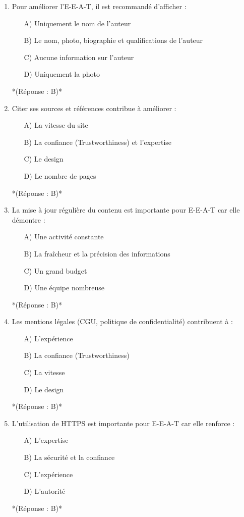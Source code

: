 \documentclass[12pt,a4paper,twoside]{report}
\begin{document}
\begin{enumerate}
\item Pour améliorer l'E-E-A-T, il est recommandé d'afficher :
\begin{itemize}
\item[A)] Uniquement le nom de l'auteur
\item[B)] Le nom, photo, biographie et qualifications de l'auteur
\item[C)] Aucune information sur l'auteur
\item[D)] Uniquement la photo
\end{itemize}
*(Réponse : B)*

\item Citer ses sources et références contribue à améliorer :
\begin{itemize}
\item[A)] La vitesse du site
\item[B)] La confiance (Trustworthiness) et l'expertise
\item[C)] Le design
\item[D)] Le nombre de pages
\end{itemize}
*(Réponse : B)*

\item La mise à jour régulière du contenu est importante pour E-E-A-T car elle démontre :
\begin{itemize}
\item[A)] Une activité constante
\item[B)] La fraîcheur et la précision des informations
\item[C)] Un grand budget
\item[D)] Une équipe nombreuse
\end{itemize}
*(Réponse : B)*

\item Les mentions légales (CGU, politique de confidentialité) contribuent à :
\begin{itemize}
\item[A)] L'expérience
\item[B)] La confiance (Trustworthiness)
\item[C)] La vitesse
\item[D)] Le design
\end{itemize}
*(Réponse : B)*

\item L'utilisation de HTTPS est importante pour E-E-A-T car elle renforce :
\begin{itemize}
\item[A)] L'expertise
\item[B)] La sécurité et la confiance
\item[C)] L'expérience
\item[D)] L'autorité
\end{itemize}
*(Réponse : B)*


\end{enumerate}
\end{document}
